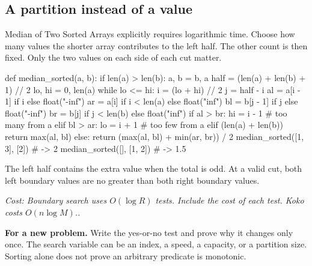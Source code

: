 \documentclass[11pt]{article}
\newcommand{\transfer}[1]{\par\textbf{For a new problem.} #1\par}
\newcommand{\cost}[1]{\par\textit{Cost: #1.}\par}
\begin{document}
\subsection{A partition instead of a value}
Median of Two Sorted Arrays explicitly requires logarithmic time.
Choose how many values the shorter array contributes to the left half. The other count is then fixed.
Only the two values on each side of each cut matter.
\par\noindent\begin{minipage}{\linewidth}
\hypertarget{example-start-26}{}
\begin{pyex}
def median_sorted(a, b):
    if len(a) > len(b):
        a, b = b, a
    half = (len(a) + len(b) + 1) // 2
    lo, hi = 0, len(a)
    while lo <= hi:
        i = (lo + hi) // 2
        j = half - i
        al = a[i - 1] if i else float("-inf")
        ar = a[i] if i < len(a) else float("inf")
        bl = b[j - 1] if j else float("-inf")
        br = b[j] if j < len(b) else float("inf")
        if al > br:
            hi = i - 1               # too many from a
        elif bl > ar:
            lo = i + 1               # too few from a
        elif (len(a) + len(b)) %
            return max(al, bl)
        else:
            return (max(al, bl) + min(ar, br)) / 2
median_sorted([1, 3], [2])            # -> 2
median_sorted([], [1, 2])             # -> 1.5
\end{pyex}
\hypertarget{example-end-26}{}
\end{minipage}\par
The left half contains the extra value when the total is odd. At a valid cut, both left boundary values are no greater than both right boundary values.
\cost{Boundary search uses \(O(\log R)\) tests. Include the cost of each test. Koko costs \(O(n\log M)\).}
\transfer{Write the yes-or-no test and prove why it changes only once.
The search variable can be an index, a speed, a capacity, or a partition size. Sorting alone does not prove an arbitrary predicate is monotonic.}
\end{document}
